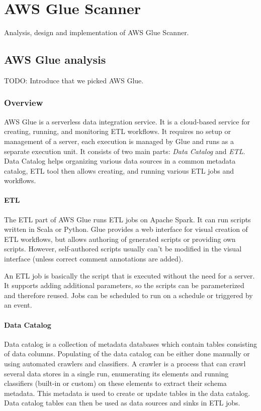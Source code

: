 \chapter{AWS Glue Scanner}

Analysis, design and implementation of AWS Glue Scanner.

\section{AWS Glue analysis}

TODO: Introduce that we picked AWS Glue.

\subsection{Overview}

AWS Glue is a serverless data integration service. It is a cloud-based service for creating, running, and monitoring ETL workflows. It requires no setup or management of a server, each execution is managed by Glue and runs as a separate execution unit. It consists of two main parts: \textit{Data Catalog} and \textit{ETL}. Data Catalog helps organizing various data sources in a common metadata catalog, ETL tool then allows creating, and running various ETL jobs and workflows.

\subsubsection{ETL}
The ETL part of AWS Glue runs ETL jobs on Apache Spark. It can run scripts written in Scala or Python. Glue provides a web interface for visual creation of ETL workflows, but allows authoring of generated scripts or providing own scripts. However, self-authored scripts usually can't be modified in the visual interface (unless correct comment annotations are added). 
\par
An ETL job is basically the script that is executed without the need for a server. It supports adding additional parameters, so the scripts can be parameterized and therefore reused. Jobs can be scheduled to run on a schedule or triggered by an event.

\subsubsection{Data Catalog}
Data catalog is a collection of metadata databases which contain tables consisting of data columns. Populating of the data catalog can be either done manually or using automated crawlers and classifiers. A crawler is a process that can crawl several data stores in a single run, enumerating its elements and running classifiers (built-in or custom) on these elements to extract their schema metadata. This metadata is used to create or update tables in the data catalog. Data catalog tables can then be used as data sources and sinks in ETL jobs.


